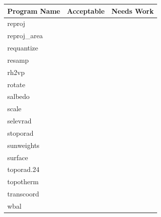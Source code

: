 \begin{tabular}{||l|l|l||} \hline
Program Name & Acceptable & Needs Work \\ \hline\hline
reproj & & \\ \hline
reproj\_area & & \\ \hline
requantize & & \\ \hline
resamp & & \\ \hline
rh2vp & & \\ \hline
rotate & & \\ \hline
salbedo & & \\ \hline
scale & & \\ \hline
selevrad & & \\ \hline
stoporad & & \\ \hline
sunweights & & \\ \hline
surface & & \\ \hline
toporad.24 & & \\ \hline
topotherm & & \\ \hline
transcoord & & \\ \hline
wbal & & \\ \hline
\end{tabular}

